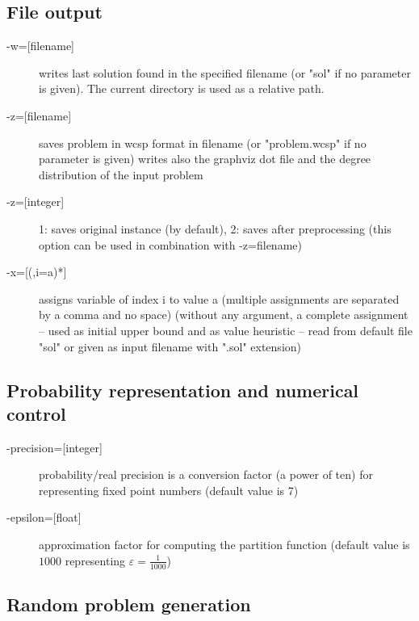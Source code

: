 \documentclass{article}
\begin{document}
\subsection{File output}

\begin{description}
\item[{-w=[filename]}] writes last solution found in the specified
  filename (or "sol" if no parameter is given). The current directory
  is used as a relative path.
\item[{-z=[filename]}]  saves problem in wcsp format in filename (or
  "problem.wcsp" if no parameter is given) writes also the graphviz
  dot file and the degree distribution of the input problem
\item[{-z=[integer]}] 1: saves original instance (by default), 2: saves
  after preprocessing (this option can be used in combination with -z=filename)
\item[{-x=[(,i=a)*]}] assigns variable of index i to value a (multiple
  assignments are separated by a comma and no space) (without any
  argument, a complete assignment -- used as initial upper bound and
  as value heuristic -- read from default file "sol" or given as input
  filename with ".sol" extension)
\end{description}

\subsection{Probability representation and numerical control}

\begin{description}
\item[{-precision=[integer]}] probability/real precision is a conversion
  factor (a power of ten) for representing fixed point numbers
  (default value is 7)
\item[{-epsilon=[float]}] approximation factor for computing the partition
  function (default value is $1000$ representing
  $\varepsilon=\frac{1}{1000}$)
\end{description}
 
\subsection{Random problem generation}
\end{document}
